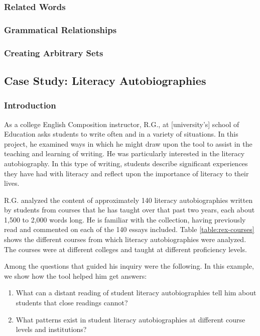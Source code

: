 \documentclass{sig-alternate}
\begin{document}
\subsubsection{Related Words}

\subsubsection{Grammatical Relationships}

\subsubsection {Creating Arbitrary Sets}


\subsection{Case Study: Literacy Autobiographies}

\subsubsection{Introduction}
As a college English Composition instructor,  R.G., at  [university's] school of Education asks students to write often and in a variety of situations. In this project, he examined ways in which he might draw upon the tool to assist in the teaching and learning of writing. He was particularly interested in the literacy autobiography. In this type of writing, students describe significant experiences they have had with literacy and reflect upon the importance of literacy to their lives.  

R.G. analyzed the content of approximately 140 literacy autobiographies written by students from courses that he has taught over that past two years, each about 1,500 to 2,000 words long. He is familiar with the collection, having previously read and commented on each of the 140 essays included.  Table \ref{table:rex-courses} shows the different courses from which literacy autobiographies were analyzed. The courses were at different colleges and taught at different proficiency levels.

Among the questions that guided his inquiry were the following. In this example, we show how the tool helped him get answers:
\begin{enumerate}
\item What can a distant reading of student literacy autobiographies tell him about students that close readings cannot?
\item What patterns exist in student literacy autobiographies at different course levels and institutions?
\end{enumerate}
\end{document}
